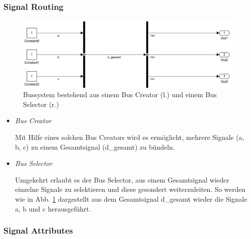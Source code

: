 \documentclass[fontsize = 12pt, paper = a4]{scrreprt}
\begin{document}
\subsubsection{Signal Routing}

\begin{figure}[h]
\centering
\includegraphics[scale = 0.45]{bus_gesamt}
\caption[Bussystem]
{Bussystem bestehend aus einem Bus Creator (l.) und einem Bus Selector (r.)}
\label{Signal Routing}
\end{figure}

\newpage

\begin{itemize}

\item[1)] \textit{Bus Creator}

Mit Hilfe eines solchen Bus Creators wird es ermöglicht, mehrere Signale (a, b, c) zu einem Gesamtsignal (d\_gesamt) zu bündeln.

\item[2)] \textit{Bus Selector}

Umgekehrt erlaubt es der Bus Selector, aus einem Gesamtsignal wieder einzelne Signale zu selektieren und diese gesondert weiterzuleiten. So werden wie in Abb. \ref{Signal Routing} dargestellt aus dem Gesamtsignal d\_gesamt wieder die Signale a, b und c herausgeführt. \\

\end{itemize}

\subsubsection{Signal Attributes}
\end{document}
